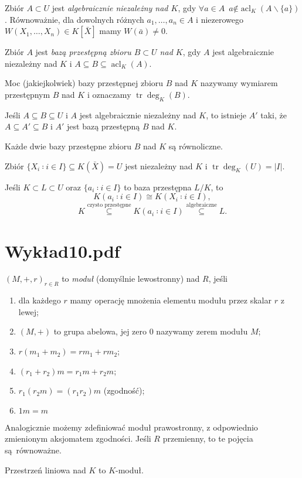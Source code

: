 \documentclass[a4paper, 12pt]{article}
\DeclareMathOperator{\acl}{acl}
\DeclareMathOperator{\tr}{tr}
\newcommand{\+}{\enspace}
\begin{document}
Zbiór $A ⊂ U$ jest \textit{algebraicznie niezależny nad $K$},
gdy $∀a∈A\+a\not∈\acl_K(A∖\{a\})$.
Równoważnie, dla dowolnych różnych $a_1,…,a_n ∈ A$ i niezerowego
$W(X_1,…,X_n) ∈ K[\bar{X}]$ mamy $W(\bar{a}) ≠0$.

Zbiór $A$ jest \textit{bazą przestępną zbioru $B⊂U$ nad $K$},
gdy $A$ jest algebraicznie niezależny nad $K$ i $A⊆B⊆\acl_K(A)$.

Moc (jakiejkolwiek) bazy przestępnej zbioru $B$ nad $K$
nazywamy wymiarem przestępnym $B$ nad $K$ i oznaczamy
$\tr \deg_K(B)$.


Jeśli $A⊆B⊆U$ i $A$ jest algebraicznie niezależny nad $K$,
to istnieje $A'$ taki, że $A ⊆ A' ⊆ B$ i $A'$ jest bazą przestępną
$B$ nad $K$.

Każde dwie bazy przestępne zbioru $B$ nad $K$ są równoliczne.

Zbiór $\{ X_i ∶ i ∈ I \} ⊆ K(\bar{X}) = U$ jest niezależny nad $K$
i $\tr \deg_K(U) = |I|$.

Jeśli $K ⊂ L ⊂ U$ oraz $\{ a_i ∶ i ∈ I \}$ to baza przestępna $L/K$, to
$$K(a_i ∶ i ∈ I) ≅ K(X_i ∶ i ∈ I),$$
$$K \stackrel{\text{czysto przestępne}}{⊆}
K(a_i ∶ i ∈ I) \stackrel{\text{algebraiczne}}{⊆} L.$$

\section*{Wykład10.pdf}

$(M, +, r)_{r ∈ R}$ to \textit{moduł} (domyślnie lewostronny) nad $R$, jeśli
\begin{enumerate}
	\item dla każdego $r$ mamy operację mnożenia elementu modułu przez skalar $r$ z lewej;
	\item $(M,+)$ to grupa abelowa, jej zero $0$ nazywamy zerem modułu $M$;
	\item $r(m_1+m_2) = rm_1 + rm_2$;
	\item $(r_1+r_2)m = r_1m + r_2m$;
	\item $r_1(r_2 m) = (r_1 r_2) m$ (zgodność); %
	\item $1m = m$
\end{enumerate}
Analogicznie możemy zdefiniować moduł prawostronny, z odpowiednio
zmienionym aksjomatem zgodności.
Jeśli $R$ przemienny, to te pojęcia są równoważne.

Przestrzeń liniowa nad $K$ to $K$-moduł.
\end{document}
